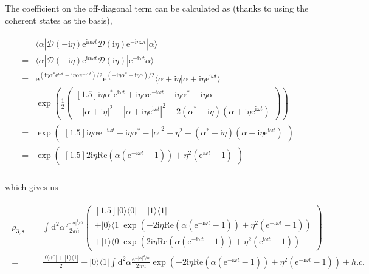 \documentclass[10pt,fleqn]{article}
\newcommand{\ud}{\mathrm{d}}
\newcommand{\ue}{\mathrm{e}}
\newcommand{\ui}{\mathrm{i}}
\newcommand{\eqar}[1]
{
  \begin{align}
    #1
  \end{align}
}
\newcommand{\paren}[1]{{\left({#1}\right)}}
\newcommand{\abs}[1]{{\left|{#1}\right|}}
\begin{document}
The coefficient on the off-diagonal term can be calculated as
(thanks to using the coherent states as the basis),
\eqar{
  \begin{split}
    &\langle\alpha|\mathcal{D}(-\ui\eta)\ue^{\ui n\omega t}
      \mathcal{D}(\ui\eta)\ue^{-\ui n\omega t}|\alpha\rangle\\
    =&\langle\alpha|\mathcal{D}(-\ui\eta)\ue^{\ui n\omega t}
       \mathcal{D}(\ui\eta)|\ue^{-\ui\omega t}\alpha\rangle\\
    =&\ue^{(\ui\eta\alpha^*\ue^{\ui\omega t}+\ui\eta\alpha\ue^{-\ui\omega t})/2}
       \ue^{(-\ui\eta\alpha^*-\ui\eta\alpha)/2}
       \langle\alpha+\ui\eta|\alpha+\ui\eta\ue^{\ui\omega t}\rangle\\
    =&\exp\paren{\frac12
       \begin{pmatrix}[1.5]
         \ui\eta\alpha^*\ue^{\ui\omega t}+\ui\eta\alpha\ue^{-\ui\omega t}
         -\ui\eta\alpha^*-\ui\eta\alpha\\
         -\abs{\alpha+\ui\eta}^2-\abs{\alpha+\ui\eta\ue^{\ui\omega t}}^2
         +2\paren{\alpha^*-\ui\eta}\paren{\alpha+\ui\eta\ue^{\ui\omega t}}
       \end{pmatrix}
       }\\
    =&\exp\begin{pmatrix}[1.5]
      \ui\eta\alpha\ue^{-\ui\omega t}-\ui\eta\alpha^*-\abs{\alpha}^2-\eta^2+\paren{\alpha^*-\ui\eta}\paren{\alpha+\ui\eta\ue^{\ui\omega t}}
    \end{pmatrix}\\
    =&\exp\begin{pmatrix}[1.5]
      2\ui\eta\mathrm{Re}\paren{\alpha\paren{\ue^{-\ui\omega t}-1}}
      +\eta^2\paren{\ue^{\ui\omega t}-1}
    \end{pmatrix}\\
  \end{split}
}
which gives us
\eqar{
  \begin{split}
    \rho_{3,\mathrm{s}}
    =&\int\ud^2\alpha \frac{\ue^{-\abs{\alpha}^2/{\bar n}}}{2\pi {\bar n}}
       \begin{pmatrix}[1.5]
         |0\rangle\langle0|
         +|1\rangle\langle1|\\
         +|0\rangle\langle1|
         \exp\paren{
         -2\ui\eta\mathrm{Re}\paren{\alpha\paren{\ue^{-\ui\omega t}-1}}
         +\eta^2\paren{\ue^{-\ui\omega t}-1}}\\
         +|1\rangle\langle0|
         \exp\paren{
         2\ui\eta\mathrm{Re}\paren{\alpha\paren{\ue^{-\ui\omega t}-1}}
         +\eta^2\paren{\ue^{\ui\omega t}-1}}
       \end{pmatrix}\\
    =&\frac{|0\rangle\langle0|+|1\rangle\langle1|}{2}+|0\rangle\langle1|\int\ud^2\alpha \frac{\ue^{-\abs{\alpha}^2/{\bar n}}}{2\pi {\bar n}}
       \exp\paren{
       -2\ui\eta\mathrm{Re}\paren{\alpha\paren{\ue^{-\ui\omega t}-1}}
       +\eta^2\paren{\ue^{-\ui\omega t}-1}}+h.c.
  \end{split}
}
\end{document}
